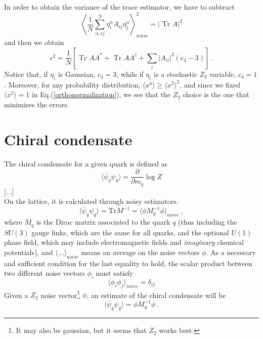 In order to obtain the variance of the trace estimator, we have to subtract
\begin{equation}
 \left\langle \frac{1}{N} \sum^N_{\alpha,ij}  \eta^\alpha_i A_{ij} 
\eta^\alpha_j \right\rangle_{noise} ^2 = \left|\mbox{ Tr }  A \right|^2 
\end{equation}
and then we obtain
\begin{equation}
 \epsilon^2 =  \frac{1}{N} \left[
\mbox{ Tr } A A^\ast + \mbox{ Tr } A A^\dagger 
+ \sum_{i} \left|A_{ii}\right|^2 \left(c_4 -3 \right) \right] \ . 
\end{equation}
Notice that, if $\eta_i$ is Gaussian, $ c_4 = 3$, 
while if $\eta_i$ is a stochastic $Z_2$ variable, $ c_4 = 1$. Moreover, for 
any probability distribution, $\langle x^4 \rangle \geq \langle x^2 
\rangle ^2$, and since we fixed $\langle x^2 \rangle = 1$ in 
Eq.(\ref{orthonormalization}), we see that the $Z_2$ choice is the one 
that minimizes the errors.\\ 






\section{Chiral condensate}

The chiral condensate for a given quark is defined as 
\begin{equation}
 \langle \bar{\psi}_q \psi_q \rangle = \frac{\partial}{\partial m_q} \log Z
\end{equation}
[...]\\
On the lattice, it is calculated through noisy estimators. 
\begin{equation}
 \langle \bar{\psi}_q \psi_q \rangle  = \textrm{Tr} M^{-1} = \langle \phi 
M_q^{-1} \phi \rangle_{noise} \ , 
\end{equation}
where $M_q$ is the Dirac matrix associated to the 
quark $q$ (thus including the $SU(3)$ gauge links, which are the same for all 
quarks, and the optional $U(1)$ phase field, which may include electromagnetic 
fields and \emph{imaginary} chemical potentials), and $\langle \ldots 
\rangle_{noise}$ means an average on the noise vectors $\phi$. As a necessary 
and sufficient condition for the last equality to hold, the scalar product 
between two different noise vectors $\phi_i$ must satisfy
\begin{equation}
 \langle \phi_i \phi_j \rangle_{noise} = \delta_{ij}
\end{equation}
Given a $Z_2$ noise vector\footnote{It may also be 
gaussian, but it 
seems that $Z_2$ works best.} $\phi$, an estimate of the chiral condensate will 
be
\begin{equation}
 \langle \bar{\psi}_q \psi_q \rangle  = \phi M_q^{-1} \phi \ .
\end{equation}

